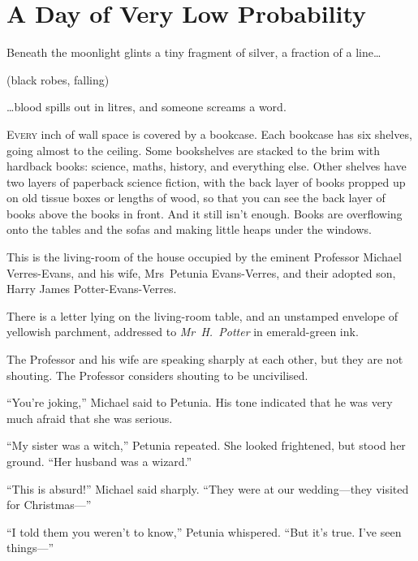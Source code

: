 \chapter{A Day of Very Low Probability}

\begin{chapterOpeningQuote}
\noindent
Beneath the moonlight glints a tiny fragment of silver, a fraction of a line…

\vspace*{2ex}
(black robes, falling)

\vspace*{2ex}
…blood spills out in litres, and someone screams a word.
\end{chapterOpeningQuote}

\lettrine{E}{very} inch of wall space is covered by a bookcase. Each bookcase has six shelves, going almost to the ceiling. Some bookshelves are stacked to the brim with hardback books: science, maths, history, and everything else. Other shelves have two layers of paperback science fiction, with the back layer of books propped up on old tissue boxes\authorsnotefootnotemark{} or lengths of wood, so that you can see the back layer of books above the books in front. And it still isn’t enough. Books are overflowing onto the tables and the sofas and making little heaps under the windows.

This is the living-room of the house occupied by the eminent Professor Michael Verres-Evans, and his wife, Mrs~Petunia Evans-Verres, and their adopted son, Harry James Potter-Evans-Verres.

There is a letter lying on the living-room table, and an unstamped envelope of yellowish parchment, addressed to \emph{Mr~H.~Potter} in emerald-green ink.

The Professor and his wife are speaking sharply at each other, but they are not shouting. The Professor considers shouting to be uncivilised.

“You’re joking,” Michael said to Petunia. His tone indicated that he was very much afraid that she was serious.

“My sister was a witch,” Petunia repeated. She looked frightened, but stood her ground. “Her husband was a wizard.”

“This is absurd!” Michael said sharply. “They were at our wedding—they visited for Christmas—”

“I told them you weren’t to know,” Petunia whispered. “But it’s true. I’ve seen things—”


